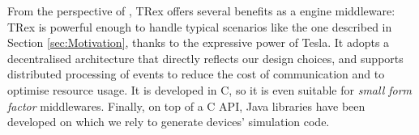 From the perspective of \IOTDSL, TRex offers several benefits as a \CEP engine middleware: TRex is powerful enough to handle typical \IOT scenarios like the one described in Section \ref{sec:Motivation}, thanks to the expressive power of Tesla. It adopts a decentralised architecture that directly reflects our design choices, and supports distributed processing of events to reduce the cost of communication and to optimise resource usage. It is developed in C, so it is even suitable for \textit{small form factor} middlewares. Finally, on top of a C \textsc{API}, Java libraries have been developed on which we rely to generate devices' simulation code.
